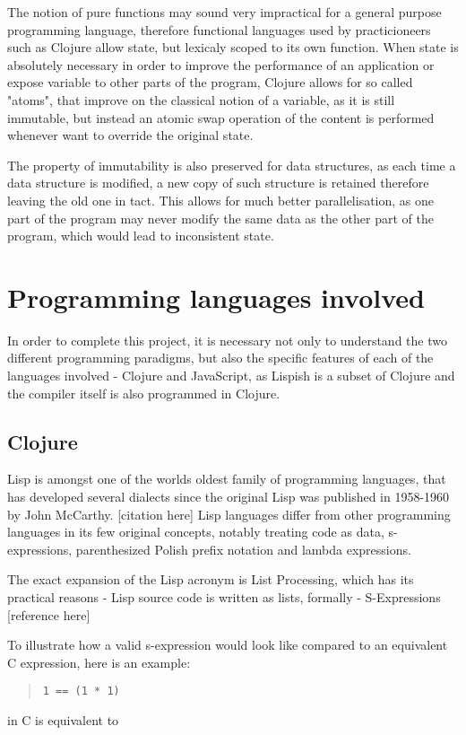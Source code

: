 The notion of pure functions may sound very impractical for a general purpose programming language, therefore functional languages used by practicioneers such as Clojure allow state, but lexicaly scoped to its own function.
When state is absolutely necessary in order to improve the performance of an application or expose variable to other parts of the program, Clojure allows for so called "atoms", that improve on the classical notion of a variable, as it is still immutable, but instead an atomic swap operation of the content is performed whenever want to override the original state.

The property of immutability is also preserved for data structures, as each time a data structure is modified, a new copy of such structure is retained therefore leaving the old one in tact. This allows for much better parallelisation, as one part of the program may never modify the same data as the other part of the program, which would lead to inconsistent state.

\section{Programming languages involved}
In order to complete this project, it is necessary not only to understand the two different programming paradigms, but also the specific features of each of the languages involved - Clojure and JavaScript, as Lispish is a subset of Clojure and the compiler itself is also programmed in Clojure.

\subsection{Clojure}
Lisp is amongst one of the worlds oldest family of programming languages, that has developed several dialects since the original Lisp was published in 1958-1960 by John McCarthy. [citation here]
Lisp languages differ from other programming languages in its few original concepts, notably treating code as data, s-expressions, parenthesized Polish prefix notation and lambda expressions.

The exact expansion of the Lisp acronym is List Processing, which has its practical reasons - Lisp source code is written as lists, formally - S-Expressions [reference here]

To illustrate how a valid s-expression would look like compared to an equivalent C expression, here is an example:

\begin{quote}
\begin{verbatim}
1 == (1 * 1)
\end{verbatim}
\end{quote}
in C is equivalent to

